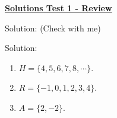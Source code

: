 \documentclass[12pt]{article} %
\begin{document}
	\renewcommand*{\coursecode}{MATH 235} %
	\renewcommand*{\assgnnumber}{Assignment 1} %
	\renewcommand*{\submdate}{September 14, 2021} %
	\renewcommand*{\studentfname}{Abdullah} %
	\renewcommand*{\studentlname}{Zubair} %
    \renewcommand*{\proofname}{Proof:}

	\renewcommand\qedsymbol{$\blacksquare$}
	\setfigpath
	\fancyhfoffset[L,O]{0pt} %




\begin{center}
	\textbf{\underline{\Huge{Solutions Test 1 - Review}}}
\end{center}
\begin{qstn} Solution:
  (Check with me)
\end{qstn}

\begin{qstn} Solution:
  \begin{enumerate}[label=(\alph*)]
    \item $H = \{4,5,6,7,8,\cdots\} $.
    \item $R = \{-1,0,1,2,3,4\} $.
    \item $A = \{2,-2\} $.
  \end{enumerate}
\end{qstn}
\end{document}
